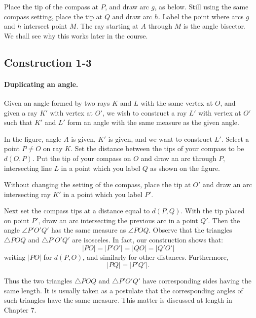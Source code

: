 \documentclass[12pt]{book} %
\begin{document}
Place the tip of the compass at $P$, and draw arc $g$, as below. Still using the same compass setting, place the tip at $Q$ and draw arc $h$. Label the point where arcs $g$ and $h$ intersect point $M$. The ray starting at $A$ through $M$ is the angle bisector. We shall see why this works later in the course.


\subsection*{Construction 1-3}

\paragraph{Duplicating an angle.}

Given an angle formed by two rays $K$ and $L$ with the same vertex at $O$, and given a ray $K'$ with vertex at $O'$, we wish to construct a ray $L'$ with vertex at $O'$ such that $K'$ and $L'$ form an angle with the same measure as the given angle.


In the figure, angle $A$ is given, $K'$ is given, and we want to construct $L'$. Select a point $P\neq O$ on ray $K$. Set the distance between the tips of your compass to be $d(O,P)$. Put the tip of your compass on $O$ and draw an arc through $P$, intersecting line $L$ in a point which you label $Q$ as shown on the figure.


Without changing the setting of the compass, place the tip at $O'$ and draw an arc intersecting ray $K'$ in a point which you label $P'$.

Next set the compass tips at a distance equal to $d(P,Q)$. With the tip placed on point $P'$, draw an arc intersecting the previous arc in a point $Q'$. Then the angle $\angle P'O'Q'$ has the same measure as $\angle POQ$. Observe that the triangles $\triangle POQ$ and $\triangle P'O'Q'$ are isosceles. In fact, our construction shows that:
\[
|PO|=|P'O'|=|QO|=|Q'O'|
\]
writing $|PO|$ for $d(P,O)$, and similarly for other distances. Furthermore,
\[
|PQ|=|P'Q'|.
\]

Thus the two triangles $\triangle POQ$ and $\triangle P'O'Q'$ have corresponding sides having the same length. It is usually taken as a postulate that the corresponding angles of such triangles have the same measure. This matter is discussed at length in Chapter 7.
\end{document}
